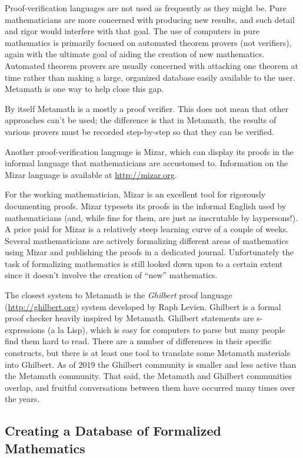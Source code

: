 Proof-verification languages are not used as frequently as they might be.
Pure mathematicians are more concerned with producing new results, and such
detail and rigor would interfere with that goal.  The use of computers in pure
mathematics is primarily focused on automated theorem provers (not verifiers),
again with the ultimate goal of aiding the creation of new mathematics.
Automated theorem provers are usually concerned with attacking one theorem at
time rather than making a large, organized database easily available to the
user.  Metamath is one way to help close this gap.

By itself Metamath is a mostly a proof verifier.
This does not mean that other approaches can't be used; the difference
is that in Metamath, the results of various provers must be recorded
step-by-step so that they can be verified.

Another proof-verification language is Mizar, which can display
its proofs in the informal language that mathematicians are accustomed to.
Information on the Mizar language is available at \url{http://mizar.org}.

For the working mathematician, Mizar is an excellent tool for rigorously
documenting proofs. Mizar typesets its proofs in the informal English used by
mathematicians (and, while fine for them, are just as inscrutable by
laypersons!). A price paid for Mizar is a relatively steep learning curve of a
couple of weeks.  Several mathematicians are actively formalizing different
areas of mathematics using Mizar and publishing the proofs in a dedicated
journal. Unfortunately the task of formalizing mathematics is still looked
down upon to a certain extent since it doesn't involve the creation of ``new''
mathematics.

The closest system to Metamath is
the {\em Ghilbert} proof language (\url{http://ghilbert.org})
system developed by
Raph Levien.
Ghilbert is a formal proof checker heavily inspired by Metamath.
Ghilbert statements are s-expressions (a la Lisp), which is easy
for computers to parse but many people find them hard to read.
There are a number of differences in their specific constructs, but
there is at least one tool to translate some Metamath materials into Ghilbert.
As of 2019 the Ghilbert community is smaller and less active than the
Metamath community.
That said, the Metamath and Ghilbert communities overlap, and fruitful
conversations between them have occurred many times over the years.

\subsection{Creating a Database of Formalized Mathematics}\label{mathdatabase}

